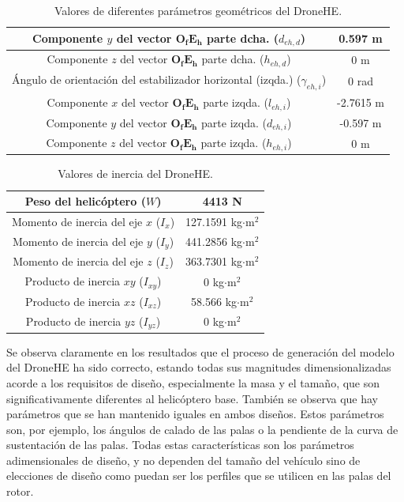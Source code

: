 \begin{table}[htbp]
\begin{tabular}{|>{\columncolor{Gray}}c|c|}
		\cellcolor{Gray}Componente $y$ del vector $\boldsymbol{O_fE_h}$ parte dcha. ($d_{eh,d}$) & 0.597 m \\ \hline
		\cellcolor{Gray}Componente $z$ del vector $\boldsymbol{O_fE_h}$ parte dcha. ($h_{eh,d}$) & 0 m \\ \hline
		\cellcolor{Gray}Ángulo de orientación del estabilizador horizontal (izqda.) ($\gamma_{eh,i}$) & 0 rad \\ \hline
		\cellcolor{Gray}Componente $x$ del vector $\boldsymbol{O_fE_h}$ parte izqda. ($l_{eh,i}$) & -2.7615 m \\ \hline
		\cellcolor{Gray}Componente $y$ del vector $\boldsymbol{O_fE_h}$ parte izqda. ($d_{eh,i}$) & -0.597 m \\ \hline
		\cellcolor{Gray}Componente $z$ del vector $\boldsymbol{O_fE_h}$ parte izqda. ($h_{eh,i}$) & 0 m \\ \hline
	\end{tabular}%
	\caption{Valores de diferentes parámetros geométricos del DroneHE.}
	\label{GeHs}
\end{table}%

\begin{table}[htbp]
	\centering
	\begin{tabular}{|>{\columncolor{Gray}}c|c|}
		\hline
		\cellcolor{Gray}Peso del helicóptero ($W$) & \cellcolor[rgb]{ 1,  1,  1}4413 N \\ \hline
		\cellcolor{Gray}Momento de inercia del eje $x$ ($I_{x}$) & \cellcolor[rgb]{ 1,  1,  1}127.1591 kg$\cdot$m$^2$ \\ \hline
		\cellcolor{Gray}Momento de inercia del eje $y$ ($I_{y}$) & \cellcolor[rgb]{ 1,  1,  1}441.2856 kg$\cdot$m$^2$ \\ \hline
		\cellcolor{Gray}Momento de inercia del eje $z$ ($I_{z}$) & \cellcolor[rgb]{ 1,  1,  1}363.7301 kg$\cdot$m$^2$ \\ \hline
		\cellcolor{Gray}Producto de inercia $xy$ ($I_{xy}$)& \cellcolor[rgb]{ 1,  1,  1}0 kg$\cdot$m$^2$ \\ \hline
		\cellcolor{Gray}Producto de inercia $xz$ ($I_{xz}$)& \cellcolor[rgb]{ 1,  1,  1}58.566 kg$\cdot$m$^2$ \\ \hline
		\cellcolor{Gray}Producto de inercia $yz$ ($I_{yz}$)& \cellcolor[rgb]{ 1,  1,  1}0 kg$\cdot$m$^2$ \\ \hline
	\end{tabular}%
	\caption{Valores de inercia del DroneHE.}
	\label{InHS}
\end{table}%

Se observa claramente en los resultados que el proceso de generación del modelo del DroneHE ha sido correcto, estando todas sus magnitudes dimensionalizadas acorde a los requisitos de diseño, especialmente la masa y el tamaño, que son significativamente diferentes al helicóptero base.
También se observa que hay parámetros que se han mantenido iguales en ambos diseños. Estos parámetros son, por ejemplo, los ángulos de calado de las palas o la pendiente de la curva de sustentación de las palas. Todas estas características son los parámetros adimensionales de diseño, y no dependen del tamaño del vehículo sino de elecciones de diseño como puedan ser los perfiles que se utilicen en las palas del rotor.

